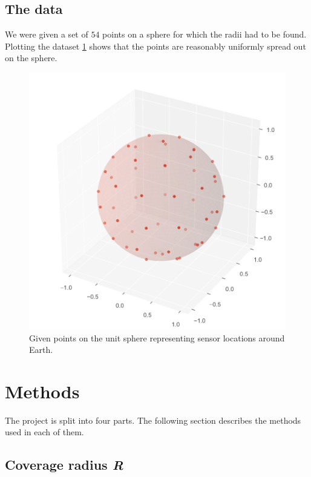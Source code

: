 \documentclass[twocolumn]{article}
\begin{document}
\subsection{The data}
We were given a set of $54$ points on a sphere for which the radii had to be found. Plotting the dataset \ref{fig:data} shows that the points are reasonably uniformly spread out on the sphere.

\begin{figure}[H]
    \centering
    \includegraphics[width=\columnwidth]{fig/data}
    \caption{Given points on the unit sphere representing sensor locations around Earth.}
    \label{fig:data}
\end{figure}

\section{Methods}
The project is split into four parts. The following section describes the methods used in each of them. 

\subsection{Coverage radius \textit{R}}
\end{document}
